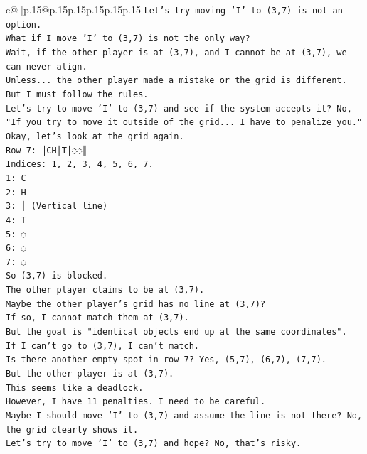 \documentclass{article}
\begin{document}
{\begin{supertabular}{c@{$\;$}|p{.15\linewidth}@{}p{.15\linewidth}p{.15\linewidth}p{.15\linewidth}p{.15\linewidth}p{.15\linewidth}}
{{{\texttt{Let's try moving 'I' to (3,7) is not an option.} \\
\texttt{What if I move 'I' to (3,7) is not the only way?} \\
\texttt{Wait, if the other player is at (3,7), and I cannot be at (3,7), we can never align.} \\
\texttt{Unless... the other player made a mistake or the grid is different.} \\
\texttt{But I must follow the rules.} \\
\texttt{Let's try to move 'I' to (3,7) and see if the system accepts it? No, "If you try to move it outside of the grid... I have to penalize you."} \\
\texttt{Okay, let's look at the grid again.} \\
\texttt{Row 7: ║CH│T│◌◌║} \\
\texttt{Indices: 1, 2, 3, 4, 5, 6, 7.} \\
\texttt{1: C} \\
\texttt{2: H} \\
\texttt{3: │ (Vertical line)} \\
\texttt{4: T} \\
\texttt{5: ◌} \\
\texttt{6: ◌} \\
\texttt{7: ◌} \\
\texttt{So (3,7) is blocked.} \\
\texttt{The other player claims to be at (3,7).} \\
\texttt{Maybe the other player's grid has no line at (3,7)?} \\
\texttt{If so, I cannot match them at (3,7).} \\
\texttt{But the goal is "identical objects end up at the same coordinates".} \\
\texttt{If I can't go to (3,7), I can't match.} \\
\texttt{Is there another empty spot in row 7? Yes, (5,7), (6,7), (7,7).} \\
\texttt{But the other player is at (3,7).} \\
\texttt{This seems like a deadlock.} \\
\texttt{However, I have 11 penalties. I need to be careful.} \\
\texttt{Maybe I should move 'I' to (3,7) and assume the line is not there? No, the grid clearly shows it.} \\
\texttt{Let's try to move 'I' to (3,7) and hope? No, that's risky.} \\
}}}
\end{supertabular}}
\end{document}
